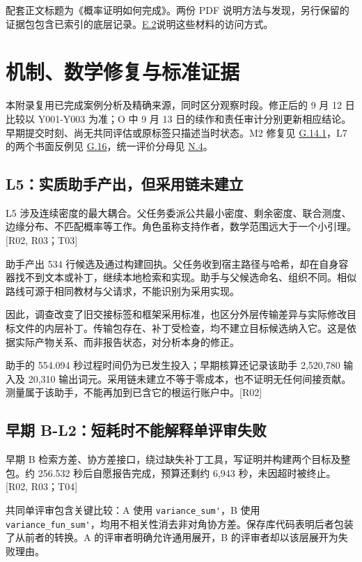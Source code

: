 配套正文标题为《概率证明如何完成》。两份 PDF 说明方法与发现，另行保留的证据包包含已索引的底层记录。\hyperlink{e2}{E.2}说明这些材料的访问方式。

\section[机制、数学修复与标准证据]{\texorpdfstring{\protect\hypertarget{appendix-g}{}机制、数学修复与标准证据}{机制、数学修复与标准证据}}
本附录复用已完成案例分析及精确来源，同时区分观察时段。修正后的 9 月 12 日比较以 Y001-Y003 为准；O 中 9 月 13 日的续作和责任审计分别更新相应结论。早期提交时刻、尚无共同评估或原标签只描述当时状态。M2 修复见 \hyperlink{g14-1}{G.14.1}，L7 的两个书面反例见 \hyperlink{g16}{G.16}，统一评价分母见 \hyperlink{n4}{N.4}。

\subsection[L5：实质助手产出，但采用链未建立]{\texorpdfstring{\protect\hypertarget{g1}{}L5：实质助手产出，但采用链未建立}{L5：实质助手产出，但采用链未建立}}
L5 涉及连续密度的最大耦合。父任务委派公共最小密度、剩余密度、联合测度、边缘分布、不匹配概率等工作。角色虽称支持作者，数学范围远大于一个小引理。[R02, R03；T03]

助手产出 534 行候选及通过构建回执。父任务收到宿主路径与哈希，却在自身容器找不到文本或补丁，继续本地检索和实现。助手与父候选命名、组织不同。相似路线可源于相同教材与父请求，不能识别为采用实现。

因此，调查改变了旧交接标签和框架采用标准，也区分外层传输差异与实际修改目标文件的内层补丁。传输包存在、补丁受检查，均不建立目标候选纳入它。这是依据实际产物关系、而非报告状态，对分析本身的修正。

助手的 554.094 秒过程时间仍为已发生投入；早期核算还记录该助手 2,520,780 输入及 20,310 输出词元。采用链未建立不等于零成本，也不证明无任何间接贡献。测量属于该助手，不能再加到已含它的根运行账户中。[R02]

\subsection[早期 B-L2：短耗时不能解释单评审失败]{\texorpdfstring{\protect\hypertarget{g2}{}早期 B-L2：短耗时不能解释单评审失败}{早期 B-L2：短耗时不能解释单评审失败}}
早期 B 检索方差、协方差接口，绕过缺失补丁工具，写证明并构建两个目标及整包。约 256.532 秒后自愿报告完成，预算还剩约 6,943 秒，未因超时被终止。[R02, R03；T04]

共同单评审包含关键比较：A 使用 \nolinkurl{variance_sum'}，B 使用 \nolinkurl{variance_fun_sum'}，均用不相关性消去非对角协方差。保存库代码表明后者包装了从前者的转换。A 的评审者明确允许通用展开，B 的评审者却以该层展开为失败理由。

